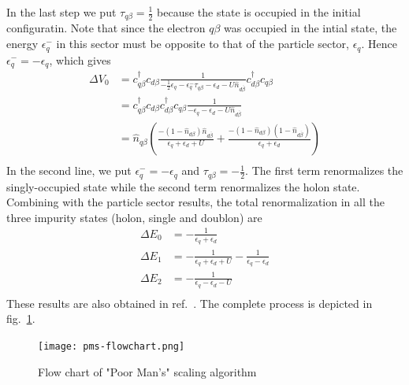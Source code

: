 In the last step we put \(\tau_{q\beta}=\frac{1}{2}\) because the state is occupied in the initial configuratin. Note that since the electron \(q\beta\) was occupied in the intial state, the energy \(\epsilon^-_q\) in this sector must be opposite to that of the particle sector, \(\epsilon_q\). Hence \(\epsilon^-_q = -\epsilon_q\), which gives
\begin{equation}\begin{aligned}
\Delta V_0 & = c^\dagger_{q\beta}c_{d\beta}\frac{1}{-\frac{1}{2} \epsilon_q -\epsilon^-_q\tau_{q\beta} - \epsilon_d - U\hat n_{d\overline\beta}}c^\dagger_{d\beta}c_{q\beta}\\
& = c^\dagger_{q\beta}c_{d\beta}c^\dagger_{d\beta}c_{q\beta}\frac{1}{-\epsilon_q - \epsilon_d - U\hat n_{d\overline\beta}}\\
& = \hat n_{q\beta}\left(\frac{-\left(1 - \hat n_{d\beta}\right)\hat n_{d\overline\beta}}{\epsilon_q + \epsilon_d + U} + \frac{-\left(1 - \hat n_{d\beta}\right)\left(1 - \hat n_{d\overline\beta}\right)}{\epsilon_q + \epsilon_d}\right)\\
\end{aligned}\end{equation}
In the second line, we put \(\epsilon^-_q = -\epsilon_q\) and \(\tau_{q\beta} = -\frac{1}{2}\). The first term renormalizes the singly-occupied state while the second term renormalizes the holon state. Combining with the particle sector results, the total renormalization in all the three impurity states (holon, single and doublon) are
\begin{equation}\begin{aligned}
\Delta E_0 &= -\frac{1}{\epsilon_q + \epsilon_d}\\
\Delta E_1 &= -\frac{1}{\epsilon_q + \epsilon_d + U} - \frac{1}{\epsilon_q - \epsilon_d}\\
\Delta E_2 &= -\frac{1}{\epsilon_q - \epsilon_d - U}\\
\end{aligned}\end{equation}
These results are also obtained in ref.~\cite{hewson1993}. The complete process is depicted in fig.~\ref{pmsflow}.
\begin{figure}
    \centering
    \texttt{[image: pms-flowchart.png]}
    \caption{Flow chart of "Poor Man's" scaling algorithm}
    \label{pmsflow}
\end{figure}

